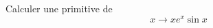 Calculer une primitive de 
\begin{displaymath}
 x \rightarrow xe^{x}\sin x
\end{displaymath}
\bigskip \bigskip
